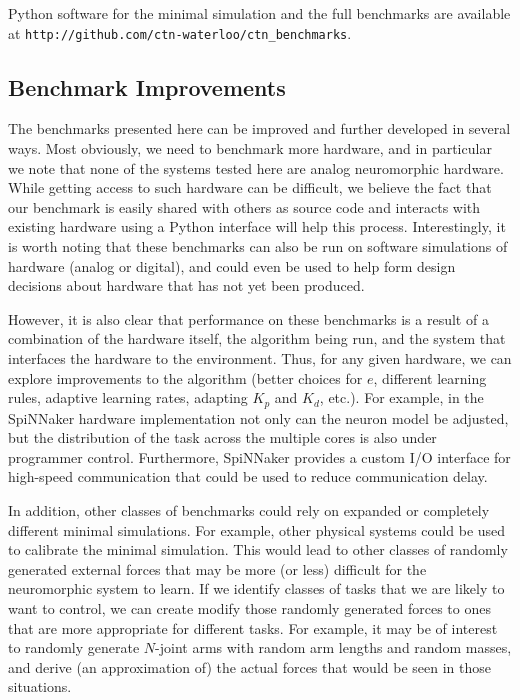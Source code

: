 \documentclass{frontiersSCNS} %
\begin{document}
Python software for the minimal simulation and the full benchmarks are
available at \texttt{http://github.com/ctn-waterloo/ctn\_benchmarks}.

\subsection{Benchmark Improvements}

The benchmarks presented here can be improved and further developed in several
ways.  Most obviously, we need to benchmark more hardware, and in particular
we note that none of the systems tested here are analog neuromorphic hardware.
While getting access to such hardware can be difficult, we believe the fact
that our benchmark is easily shared with others as source code and interacts
with existing hardware using a Python interface will help this process.
Interestingly, it is worth noting that these
benchmarks can also be run on software simulations of hardware (analog or
digital), and could even be used to help form design decisions about hardware
that has not yet been produced.

However, it is also clear that performance on these benchmarks is a result of
a combination of the hardware itself, the algorithm being run, and the system that
interfaces the hardware to the environment.  Thus, for any given hardware, 
we can explore improvements to the algorithm (better choices for $e$, 
different learning rules, adaptive learning rates, adapting $K_p$ and $K_d$, etc.).
For example, in the SpiNNaker hardware implementation not only can the neuron model
be adjusted, but the distribution of the task across the multiple cores is also
under programmer control.  Furthermore, SpiNNaker provides a custom I/O interface
for high-speed communication that could be used to reduce communication delay.

In addition, other classes of benchmarks could rely on expanded or completely
different minimal simulations.  For example, other physical systems could
be used to calibrate the minimal simulation.  This would lead to other classes
of randomly generated external forces that may be more (or less) difficult
for the neuromorphic system to learn.  If we
identify classes of tasks that we are likely to want to control, we can
create modify those randomly generated forces to ones that are more appropriate
for different tasks.  For example, it
may be of interest to randomly generate $N$-joint arms with random arm
lengths and random masses, and derive (an approximation of) the actual forces 
that would be seen in those situations.
\end{document}

